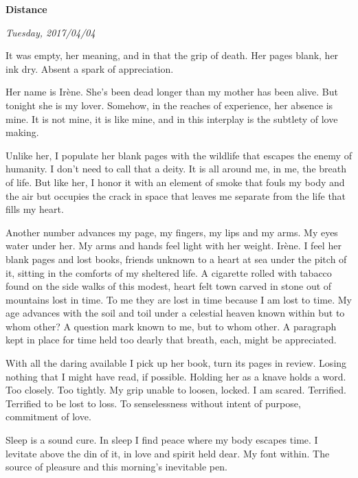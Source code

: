 

\centerline{\bf Distance}
\centerline{\it Tuesday, 2017/04/04}

\vfill
\break

It was empty, her meaning, and in that the grip of death.  Her pages
blank, her ink dry.  Absent a spark of appreciation.

Her name is Ir\`{e}ne.  She's been dead longer than my mother has been
alive.  But tonight she is my lover.  Somehow, in the reaches of
experience, her absence is mine.  It is not mine, it is like mine, and
in this interplay is the subtlety of love making.

Unlike her, I populate her blank pages with the wildlife that escapes
the enemy of humanity.  I don't need to call that a deity.  It is all
around me, in me, the breath of life.  But like her, I honor it with
an element of smoke that fouls my body and the air but occupies the
crack in space that leaves me separate from the life that fills my
heart.

\vfill
\break

﻿Another number advances my page, my fingers, my lips and my arms.  My
eyes water under her.  My arms and hands feel light with her weight.
Ir\`{e}ne.  I feel her blank pages and lost books, friends unknown to a
heart at sea under the pitch of it, sitting in the comforts of my
sheltered life.  A cigarette rolled with tabacco found on the side
walks of this modest, heart felt town carved in stone out of mountains
lost in time.  To me they are lost in time because I am lost to time.
My age advances with the soil and toil under a celestial heaven known
within but to whom other?  A question mark known to me, but to whom
other.  A paragraph kept in place for time held too dearly that
breath, each, might be appreciated.

With all the daring available I pick up her book, turn its pages in
review.  Losing nothing that I might have read, if possible.  Holding
her as a knave holds a word.  Too closely.  Too tightly.  My grip
unable to loosen, locked.  I am scared.  Terrified.  Terrified to be
lost to loss.  To senselessness without intent of purpose, commitment
of love.

Sleep is a sound cure.  In sleep I find peace where my body escapes
time.  I levitate above the din of it, in love and spirit held dear.
My font within.  The source of pleasure and this morning's inevitable
pen.

\vfill
\break

